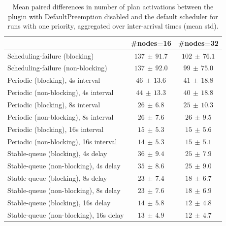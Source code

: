 \begin{table}[t]
\tiny
\setlength{\tabcolsep}{1.2pt}
\renewcommand{\arraystretch}{1.12}
\centering
\caption{Mean paired differences in number of plan activations between the plugin with DefaultPreemption disabled and the default scheduler for runs with one priority, aggregated over inter-arrival times (mean \pm std).}
\label{tab:plan_activations-defpreempt0-prio1-std1-agg-arrival}
\begin{tabular}{l c c}
\toprule
 & \#nodes=16 & \#nodes=32 \\
\midrule
Scheduling-failure (blocking) & $137\,\pm\,91.7$ & $102\,\pm\,76.1$ \\
Scheduling-failure (non-blocking) & $137\,\pm\,92.0$ & $99\,\pm\,75.0$ \\
Periodic (blocking), 4s interval & $46\,\pm\,13.6$ & $41\,\pm\,18.8$ \\
Periodic (non-blocking), 4s interval & $44\,\pm\,13.3$ & $40\,\pm\,18.8$ \\
Periodic (blocking), 8s interval & $26\,\pm\,6.8$ & $25\,\pm\,10.3$ \\
Periodic (non-blocking), 8s interval & $26\,\pm\,7.6$ & $26\,\pm\,9.5$ \\
Periodic (blocking), 16s interval & $15\,\pm\,5.3$ & $15\,\pm\,5.6$ \\
Periodic (non-blocking), 16s interval & $14\,\pm\,5.3$ & $15\,\pm\,5.1$ \\
Stable-queue (blocking), 4s delay & $36\,\pm\,9.4$ & $25\,\pm\,7.9$ \\
Stable-queue (non-blocking), 4s delay & $35\,\pm\,8.6$ & $25\,\pm\,9.0$ \\
Stable-queue (blocking), 8s delay & $23\,\pm\,7.4$ & $18\,\pm\,6.7$ \\
Stable-queue (non-blocking), 8s delay & $23\,\pm\,7.6$ & $18\,\pm\,6.9$ \\
Stable-queue (blocking), 16s delay & $14\,\pm\,5.8$ & $12\,\pm\,4.8$ \\
Stable-queue (non-blocking), 16s delay & $13\,\pm\,4.9$ & $12\,\pm\,4.7$ \\
\bottomrule
\end{tabular}
\end{table}
